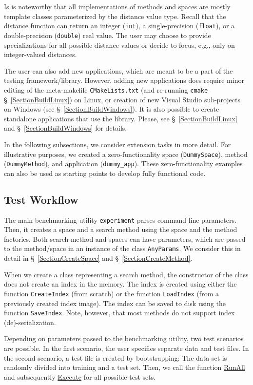 \documentclass[runningheads,a4paper]{llncs}
\newcommand{\replocfile}{https://github.com/searchivarius/nmslib/blob/v1.5/}
\newcommand{\ttt}[1]{\texttt{#1}}
\begin{document}
Is is noteworthy that all implementations of methods and spaces
are mostly template classes parameterized by the distance value type.
Recall that the distance function can return an integer (\ttt{int}), 
a single-precision (\ttt{float}), or a double-precision (\ttt{double}) real value.
The user may choose to provide specializations for all possible
distance values or decide to focus, e.g., only on integer-valued distances.

The user can also add new applications, which are meant to be 
a part of the testing framework/library.
However, adding new applications does require minor editing of the meta-makefile \ttt{CMakeLists.txt} 
(and re-running \ttt{cmake} \S~\ref{SectionBuildLinux}) on Linux,
or creation of new Visual Studio sub-projects on Windows (see \S~\ref{SectionBuildWindows}).
It is also possible to create standalone applications that use the library.
Please, see \S~\ref{SectionBuildLinux} and \S~\ref{SectionBuildWindows} for details.

In the following subsections, 
we consider extension tasks in more detail.
For illustrative purposes,
we created a zero-functionality space (\ttt{DummySpace}), 
method (\ttt{DummyMethod}), and application (\ttt{dummy\_app}).
These zero-functionality examples can also be used as starting points to develop fully functional code.

\subsection{Test Workflow}\label{SectionWorkflow}
The main benchmarking utility \ttt{experiment} parses command line parameters. 
Then, it creates a space and a search method using the space and the method factories.
Both search method and spaces can have parameters,
which are passed to the method/space in an instance
of the class \ttt{AnyParams}. We consider this in detail in \S~\ref{SectionCreateSpace} and \S~\ref{SectionCreateMethod}.

When we create a class representing a search method,
the constructor of the class does not create an index in the memory.
The index is created using either the function \ttt{CreateIndex} (from scratch)
or the function \ttt{LoadIndex} (from a previously created index image).
The index can be saved to disk using the function \ttt{SaveIndex}.
Note, however, that most methods do not support index (de)-serialization.

Depending on parameters passed to the benchmarking utility, two test scenarios are possible.
In the first scenario, the user specifies separate data and test files.
In the second scenario, a test file is created by bootstrapping:
The data set is randomly divided into training and a test set.
Then,
we call the function \href{\replocfile similarity_search/include/experiments.h#L70}{RunAll} 
and subsequently \href{\replocfile similarity_search/include/experiments.h#L213}{Execute} for all possible test sets.
\end{document}
